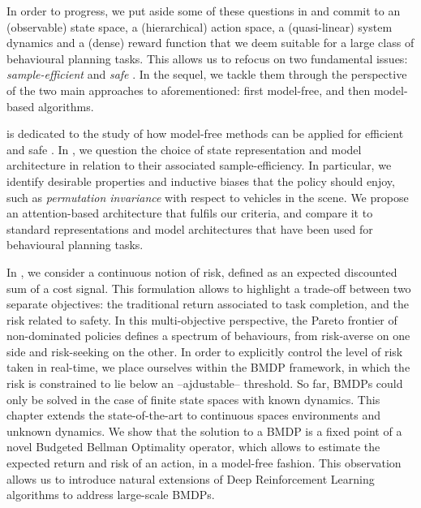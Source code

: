 In order to progress, we put aside some of these questions in \textbf{} and commit to an (observable) state space, a (hierarchical) action space, a (quasi-linear) system dynamics and a (dense) reward function that we deem suitable for a large class of behavioural planning tasks. This allows us to refocus on two fundamental issues: \textit{sample-efficient} and \textit{safe} . In the sequel, we tackle them through the perspective of the two main approaches to  aforementioned: first \gls{model-free}, and then \gls{model-based} algorithms.

\textbf{} is dedicated to the study of how \gls{model-free} methods can be applied for efficient and safe . In \textbf{}, we question the choice of state representation and model architecture in relation to their associated sample-efficiency. In particular, we identify desirable properties and inductive biases that the policy should enjoy, such as \emph{permutation invariance} with respect to vehicles in the scene. We propose an attention-based architecture that fulfils our criteria, and compare it to standard representations and model architectures that have been used for behavioural planning tasks. 

In \textbf{}, we consider a continuous notion of risk, defined as an expected discounted sum of a cost signal. This formulation allows to highlight a trade-off between two separate objectives: the traditional return associated to task completion, and the risk related to safety. In this multi-objective perspective, the Pareto frontier of non-dominated policies defines a spectrum of behaviours, from risk-averse on one side and risk-seeking on the other. In order to explicitly control the level of risk taken in real-time, we place ourselves within the \gls{BMDP} framework, in which the risk is constrained to lie below an --ajdustable-- threshold. 
So far, \glspl{BMDP} could only be solved in the case of finite state spaces with known dynamics. This chapter extends the state-of-the-art to continuous spaces environments and unknown dynamics. We show that the solution to a \gls{BMDP} is a fixed point of a novel Budgeted Bellman Optimality operator, which allows to estimate the expected return and risk of an action, in a model-free fashion. This observation allows us to introduce natural extensions of Deep Reinforcement Learning algorithms to address large-scale \glspl{BMDP}.

